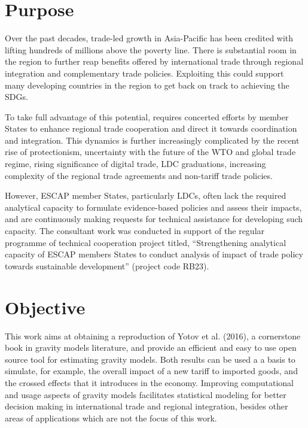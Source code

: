 \documentclass[12pt,reqno,oneside,pdftex]{formato-puc/puctesis} %
\begin{document}
\hypertarget{purpose}{%
\section{Purpose}\label{purpose}}

Over the past decades, trade-led growth in Asia-Pacific has been
credited with lifting hundreds of millions above the poverty line. There
is substantial room in the region to further reap benefits offered by
international trade through regional integration and complementary trade
policies. Exploiting this could support many developing countries in the
region to get back on track to achieving the SDGs.

To take full advantage of this potential, requires concerted efforts by
member States to enhance regional trade cooperation and direct it
towards coordination and integration. This dynamics is further
increasingly complicated by the recent rise of protectionism,
uncertainty with the future of the WTO and global trade regime, rising
significance of digital trade, LDC graduations, increasing complexity of
the regional trade agreements and non-tariff trade policies.

However, ESCAP member States, particularly LDCs, often lack the required
analytical capacity to formulate evidence-based policies and assess
their impacts, and are continuously making requests for technical
assistance for developing such capacity. The consultant work was
conducted in support of the regular programme of technical cooperation
project titled, ``Strengthening analytical capacity of ESCAP members
States to conduct analysis of impact of trade policy towards sustainable
development'' (project code RB23).

\hypertarget{objective}{%
\section{Objective}\label{objective}}

This work aims at obtaining a reproduction of Yotov et al. (2016), a
cornerstone book in gravity models literature, and provide an efficient
and easy to use open source tool for estimating gravity models. Both
results can be used a a basis to simulate, for example, the overall
impact of a new tariff to imported goods, and the crossed effects that
it introduces in the economy. Improving computational and usage aspects
of gravity models facilitates statistical modeling for better decision
making in international trade and regional integration, besides other
areas of applications which are not the focus of this work.
\end{document}
